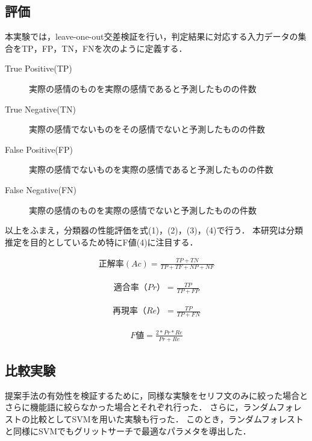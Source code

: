 \subsection{評価}
本実験では，leave-one-out交差検証を行い，判定結果に対応する入力データの集合をTP，FP，TN，FNを次のように定義する．

\begin{description}
   \item[True Positive(TP)] 実際の感情のものを実際の感情であると予測したものの件数
   \item[True Negative(TN)] 実際の感情でないものをその感情でないと予測したものの件数
   \item[False Positive(FP)] 実際の感情でないものを実際の感情であると予測したものの件数
   \item[False Negative(FN)] 実際の感情のものを実際の感情でないと予測したものの件数
 \end{description}


以上をふまえ，分類器の性能評価を式(1)，(2)，(3)，(4)で行う．
本研究は分類推定を目的としているため特にF値(4)に注目する．

\begin{eqnarray}
  正解率(Ac) =  \frac{TP + TN} {TP + TF + NP + NF}
\end{eqnarray}

\begin{eqnarray}
  適合率（Pr） = \frac{TP} {TP + FP}
\end{eqnarray}

\begin{eqnarray}
  再現率（Re） =  \frac{TP} {TP + FN}
\end{eqnarray}

\begin{eqnarray}
  F値 =  \frac{2*Pr*Re}{Pr + Re}
\end{eqnarray}


\subsection{比較実験}
提案手法の有効性を検証するために，同様な実験をセリフ文のみに絞った場合とさらに機能語に絞らなかった場合とそれぞれ行った．
さらに，ランダムフォレストの比較としてSVMを用いた実験も行った．
このとき，ランダムフォレストと同様にSVMでもグリットサーチで最適なパラメタを導出した．
